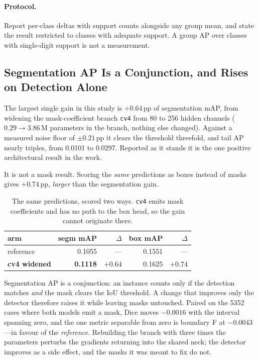 \documentclass[10pt,twocolumn,letterpaper]{article}
\begin{document}
\paragraph{Protocol.} Report per-class deltas with support counts alongside any
group mean, and state the result restricted to classes with adequate support. A
group AP over classes with single-digit support is not a measurement.

\subsection{Segmentation AP Is a Conjunction, and Rises on Detection Alone}
\label{sec:conjunction}

The largest single gain in this study is $+0.64$\,pp of segmentation mAP, from
widening the mask-coefficient branch \texttt{cv4} from 80 to 256 hidden channels
($0.29\to3.86$\,M parameters in the branch, nothing else changed). Against a
measured noise floor of $\pm0.21$\,pp it clears the threshold threefold, and
tail AP nearly triples, from 0.0101 to 0.0297. Reported as it stands it is the
one positive architectural result in the work.

It is not a mask result. Scoring the \emph{same} predictions as boxes instead of
masks gives $+0.74$\,pp, \emph{larger} than the segmentation gain.

\begin{table}[h]
\centering\small
\begin{tabular}{lrrrr}
\toprule
arm & segm mAP & $\Delta$ & box mAP & $\Delta$ \\
\midrule
reference & 0.1055 & --- & 0.1551 & --- \\
\textbf{cv4 widened} & \textbf{0.1118} & $\mathbf{+0.64}$ & 0.1625 & $\mathbf{+0.74}$ \\
\bottomrule
\end{tabular}
\caption{The same predictions, scored two ways. \texttt{cv4} emits mask
coefficients and has no path to the box head, so the gain cannot originate
there.}
\end{table}

Segmentation AP is a conjunction: an instance counts only if the detection
matches \emph{and} the mask clears the IoU threshold. A change that improves
only the detector therefore raises it while leaving masks untouched. Paired on
the 5352 cases where both models emit a mask, Dice moves $-0.0016$ with the
interval spanning zero, and the one metric separable from zero is boundary
F at $-0.0043$---in favour of the \emph{reference}. Rebuilding the branch with
three times the parameters perturbs the gradients returning into the shared
neck; the detector improves as a side effect, and the masks it was meant to fix
do not.
\end{document}
